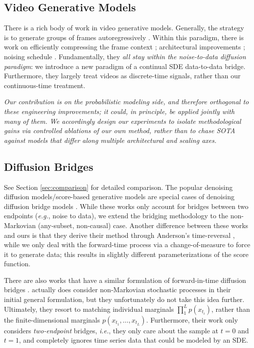 \subsection{Video Generative Models}

There is a rich body of work in video generative models. Generally, the strategy is to generate groups of frames autoregressively \cite{ho2022video}. Within this paradigm, there is work on efficiently compressing the frame context \cite{zhang2025pretraining, zhang2025frame, cai2025mixture}; architectural improvements \cite{ma2024latte}; noising schedule \cite{chen2024diffusion, sun2025ar}.
Fundamentally, they \textit{all stay within the noise-to-data diffusion paradigm}: we introduce a new paradigm of a continual SDE data-to-data bridge. Furthermore, they largely treat videos as discrete-time signals, rather than our continuous-time treatment.

\textit{Our contribution is on the probabilistic modeling side, and therefore orthogonal to these engineering improvements; it could, in principle, be applied jointly with many of them. We accordingly design our experiments to isolate methodological gains via controlled ablations of our own method, rather than to chase SOTA against models that differ along multiple architectural and scaling axes.}

\subsection{Diffusion Bridges}
See Section \ref{sec:comparison} for detailed comparison. The popular denoising diffusion models/score-based generative models \cite{song2020score, ho2020denoising} are special cases of denoising diffusion bridge models \cite{zhou2023denoising}.
While these works only account for bridges between two endpoints (\textit{e.g.}, noise to data), we extend the bridging methodology to the non-Markovian (any-subset, non-causal) case.
Another difference between these works and ours is that they derive their method through Anderson's time-reversal \cite{anderson1982reverse}, while we only deal with the forward-time process via a change-of-measure to force it to generate data; this results in slightly different parameterizations of the score function.

There are also works that have a similar formulation of forward-in-time diffusion bridges \cite{liu2022let, peluchetti2023diffusion, peluchetti2023non}. \cite{liu2022let} actually does consider non-Markovian stochastic processes in their initial general formulation, but they unfortunately do not take this idea further. Ultimately, they resort to matching individual marginals $\prod_1^L p(x_{t_i})$, rather than the finite-dimensional marginals $p(x_{t_1}, \ldots, x_{t_L})$. Furthermore, their work only considers \textit{two-endpoint} bridges, \textit{i.e.}, they only care about the sample at $t = 0$ and $t = 1$, and completely ignores time series data that could be modeled by an SDE.

